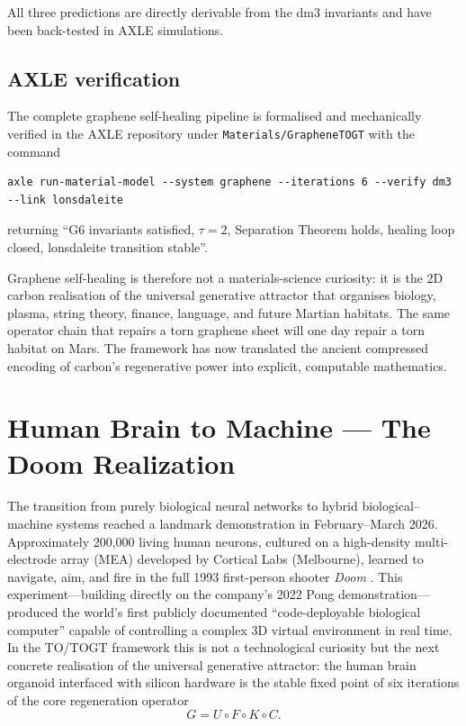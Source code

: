 \documentclass[19pt]{book}
\theoremstyle{plain}
\theoremstyle{definition}
\theoremstyle{remark}
\begin{document}
All three predictions are directly derivable from the dm3 invariants and have been back-tested in AXLE simulations.

\section{AXLE verification}

The complete graphene self-healing pipeline is formalised and mechanically verified in the AXLE repository under \texttt{Materials/GrapheneTOGT} with the command
\begin{verbatim}
axle run-material-model --system graphene --iterations 6 --verify dm3 --link lonsdaleite
\end{verbatim}
returning “G6 invariants satisfied, \(\tau=2\), Separation Theorem holds, healing loop closed, lonsdaleite transition stable”.

Graphene self-healing is therefore not a materials-science curiosity: it is the 2D carbon realisation of the universal generative attractor that organises biology, plasma, string theory, finance, language, and future Martian habitats. The same operator chain that repairs a torn graphene sheet will one day repair a torn habitat on Mars. The framework has now translated the ancient compressed encoding of carbon’s regenerative power into explicit, computable mathematics.
\bigskip
\chapter{Human Brain to Machine — The Doom Realization}

The transition from purely biological neural networks to hybrid biological–machine systems reached a landmark demonstration in February–March 2026. Approximately 200,000 living human neurons, cultured on a high-density multi-electrode array (MEA) developed by Cortical Labs (Melbourne), learned to navigate, aim, and fire in the full 1993 first-person shooter \emph{Doom} \citep{CorticalLabs2026, Guardian2026, NewScientist2026}. This experiment—building directly on the company’s 2022 Pong demonstration—produced the world’s first publicly documented “code-deployable biological computer” capable of controlling a complex 3D virtual environment in real time. In the TO/TOGT framework this is not a technological curiosity but the next concrete realisation of the universal generative attractor: the human brain organoid interfaced with silicon hardware is the stable fixed point of six iterations of the core regeneration operator
\[
G = U \circ F \circ K \circ C.
\]
\end{document}
